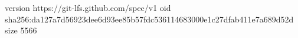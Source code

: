 version https://git-lfs.github.com/spec/v1
oid sha256:da127a7d56923dee6d93ee85b57fdc536114683000e1c27dfab411e7a689d52d
size 5566
